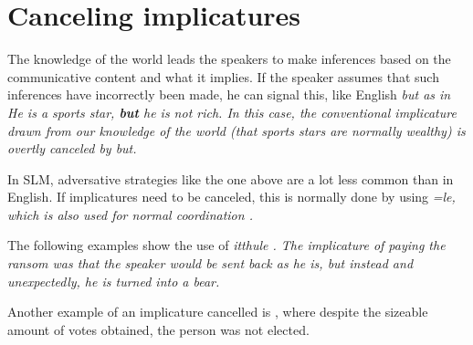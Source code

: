 % 


 
\section{Canceling implicatures}\label{sec:disc:Cancelingimplicatures}
The knowledge of the world leads the speakers to make inferences based on the communicative content and what it implies. If the speaker assumes that such inferences have incorrectly been made, he can signal this, like English \em  but \em as in \em He is a sports star, \textbf{but} he is not rich\em. In this case, the conventional implicature drawn from our knowledge of the world (that sports stars are normally wealthy) is overtly canceled by \em but\em.

In SLM, adversative strategies like the one above are a lot less common than in English. If implicatures need to be canceled, this is normally done by using \em =le\em, which is also used for normal coordination \citep[cf.][]{Haspelmath2004intro}.

The following examples show the use of \em itthule \em {}.  The implicature of paying the ransom was that the speaker would be sent back as he is, but instead and unexpectedly, he is turned into a bear.
 

Another example of an implicature cancelled is , where despite the sizeable amount of votes obtained, the person was not elected.

